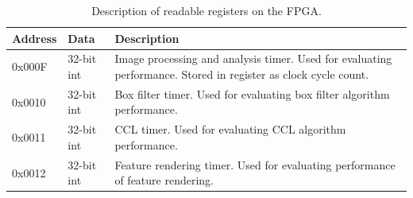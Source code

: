 \documentclass[12pt]{report}
\begin{document}
\begin{table}[h]
    \begin{tabular}{|p{2cm}|p{2cm}|p{9cm}|}
        \hline
        \textbf{Address}&\textbf{Data}&\textbf{Description}\\
        \hline
        0x000F&32-bit int&Image processing and analysis timer. Used for evaluating performance. Stored in register as clock cycle count.\\
        \hline
        0x0010&32-bit int&Box filter timer. Used for evaluating box filter algorithm performance.\\ 
        \hline
        0x0011&32-bit int&CCL timer. Used for evaluating CCL algorithm performance.\\
        \hline
        0x0012&32-bit int&Feature rendering timer. Used for evaluating performance of feature rendering.\\
        \hline
    \end{tabular}
    \caption{Description of readable registers on the FPGA.}
    \label{table:regs2}
\end{table}
\end{document}
